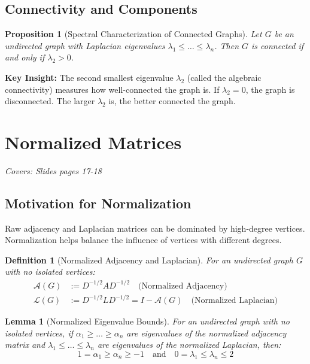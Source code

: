 \documentclass[11pt]{article}
\newtheorem{lemma}{Lemma}
\newtheorem{definition}{Definition}
\newtheorem{proposition}{Proposition}
\begin{document}
\subsection{Connectivity and Components}

\begin{proposition}[Spectral Characterization of Connected Graphs]
Let $G$ be an undirected graph with Laplacian eigenvalues $\lambda_1 \leq \ldots \leq \lambda_n$. Then $G$ is connected if and only if $\lambda_2 > 0$.
\end{proposition}

\textbf{Key Insight:} The second smallest eigenvalue $\lambda_2$ (called the algebraic connectivity) measures how well-connected the graph is. If $\lambda_2 = 0$, the graph is disconnected. The larger $\lambda_2$ is, the better connected the graph.

\section{Normalized Matrices}
\textit{Covers: Slides pages 17-18}

\subsection{Motivation for Normalization}
Raw adjacency and Laplacian matrices can be dominated by high-degree vertices. Normalization helps balance the influence of vertices with different degrees.

\begin{definition}[Normalized Adjacency and Laplacian]
For an undirected graph $G$ with no isolated vertices:
\begin{align}
\mathcal{A}(G) &:= D^{-1/2} A D^{-1/2} \quad \text{(Normalized Adjacency)}\\
\mathcal{L}(G) &:= D^{-1/2} L D^{-1/2} = I - \mathcal{A}(G) \quad \text{(Normalized Laplacian)}
\end{align}
\end{definition}

\begin{lemma}[Normalized Eigenvalue Bounds]
For an undirected graph with no isolated vertices, if $\alpha_1 \geq \ldots \geq \alpha_n$ are eigenvalues of the normalized adjacency matrix and $\lambda_1 \leq \ldots \leq \lambda_n$ are eigenvalues of the normalized Laplacian, then:
$$1 = \alpha_1 \geq \alpha_n \geq -1 \quad \text{and} \quad 0 = \lambda_1 \leq \lambda_n \leq 2$$
\end{lemma}
\end{document}
